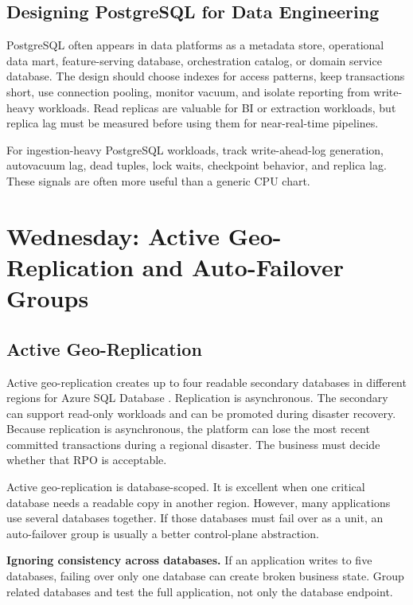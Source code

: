 \subsection{Designing PostgreSQL for Data Engineering}
PostgreSQL often appears in data platforms as a metadata store, operational data mart, feature-serving database, orchestration catalog, or domain service database. The design should choose indexes for access patterns, keep transactions short, use connection pooling, monitor vacuum, and isolate reporting from write-heavy workloads. Read replicas are valuable for BI or extraction workloads, but replica lag must be measured before using them for near-real-time pipelines.

\begin{tipbox}
For ingestion-heavy PostgreSQL workloads, track write-ahead-log generation, autovacuum lag, dead tuples, lock waits, checkpoint behavior, and replica lag. These signals are often more useful than a generic CPU chart.
\end{tipbox}

\section{Wednesday: Active Geo-Replication and Auto-Failover Groups}

\subsection{Active Geo-Replication}
Active geo-replication creates up to four readable secondary databases in different regions for Azure SQL Database \cite{microsoft2025activeGeoReplication}. Replication is asynchronous. The secondary can support read-only workloads and can be promoted during disaster recovery. Because replication is asynchronous, the platform can lose the most recent committed transactions during a regional disaster. The business must decide whether that RPO is acceptable.

Active geo-replication is database-scoped. It is excellent when one critical database needs a readable copy in another region. However, many applications use several databases together. If those databases must fail over as a unit, an auto-failover group is usually a better control-plane abstraction.

\begin{pitfall}
\textbf{Ignoring consistency across databases.} If an application writes to five databases, failing over only one database can create broken business state. Group related databases and test the full application, not only the database endpoint.
\end{pitfall}

